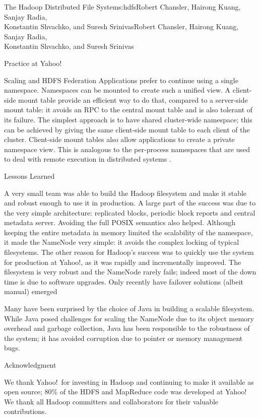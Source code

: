 \begin{aosachaptertoc}{The Hadoop Distributed File System}{s:hdfs}{Robert Chansler, Hairong Kuang, Sanjay Radia, \\ Konstantin Shvachko, and Suresh Srinivas}{Robert Chansler, Hairong Kuang, Sanjay Radia, \\ \hspace*{0.9cm} Konstantin Shvachko, and Suresh Srinivas}
\begin{aosasect1}{Practice at Yahoo!}
\begin{aosasect2}{Scaling and HDFS Federation}
Applications prefer to continue using a single namespace. Namespaces
can be mounted to create such a unified view. A client-side mount
table provide an efficient way to do that, compared to a server-side
mount table: it avoids an RPC to the central mount table and is also
tolerant of its failure. The simplest approach is to have shared
cluster-wide namespace; this can be achieved by giving the same
client-side mount table to each client of the cluster. Client-side
mount tables also allow applications to create a private namespace
view. This is analogous to the per-process namespaces that are used to
deal with remote execution in distributed systems
\cite{bib:pike:names,bib:radia:naming,bib:radia:naming2}.

\end{aosasect2}

\end{aosasect1}

\begin{aosasect1}{Lessons Learned}

A very small team was able to build the Hadoop filesystem and make it
stable and robust enough to use it in production.  A large part of the
success was due to the very simple architecture: replicated blocks,
periodic block reports and central metadata server. Avoiding the full
POSIX semantics also helped. Although keeping the entire metadata in
memory limited the scalability of the namespace, it made the NameNode
very simple: it avoids the complex locking of typical filesystems. The
other reason for Hadoop's success was to quickly use the system for
production at Yahoo!, as it was rapidly and incrementally
improved. The filesystem is very robust and the NameNode rarely fails;
indeed most of the down time is due to software upgrades. Only
recently have failover solutions (albeit manual) emerged

Many have been surprised by the choice of Java in building a scalable
filesystem. While Java posed challenges for scaling the NameNode due
to its object memory overhead and garbage collection, Java has been
responsible to the robustness of the system; it has avoided
corruption due to pointer or memory management bugs.

\end{aosasect1}

\begin{aosasect1}{Acknowledgment}

We thank Yahoo!\ for investing in Hadoop and continuing to
make it available as open source; 80\% of the HDFS and MapReduce code
was developed at Yahoo! We thank all Hadoop committers and
collaborators for their valuable contributions.

\end{aosasect1}

\end{aosachaptertoc}
